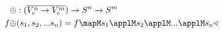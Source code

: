 \documentclass[preview]{standalone}
\begin{document}
\begin{align*}
    \oplus &: (\wrapdf{V^n_e \rightarrow V^m_e}) \rightarrow S^n \rightarrow S^m\\
    f \oplus &(s_1,s_2,...s_n) = f \mapM s_1 \applM s_2 \applM ... \applM s_n \funzip
\end{align*}
\end{document}
